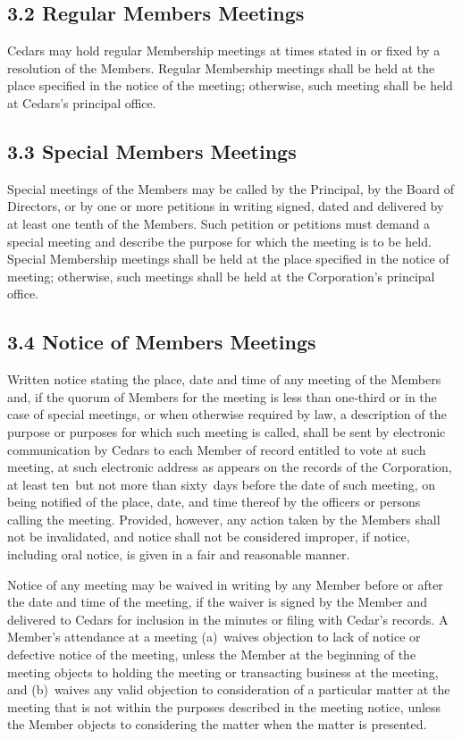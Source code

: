 \documentclass[
]{book}
\begin{document}
\subsection{3.2 Regular Members Meetings}\label{regular-members-meetings}

Cedars may hold regular Membership meetings at times stated in or fixed by a resolution of the Members. Regular Membership meetings shall be held at the place specified in the notice of the meeting; otherwise, such meeting shall be held at Cedars's principal office.

\subsection{3.3 Special Members Meetings}\label{special-members-meetings}

Special meetings of the Members may be called by the Principal, by the Board of Directors, or by one or more petitions in writing signed, dated and delivered by at least one tenth of the Members. Such petition or petitions must demand a special meeting and describe the purpose for which the meeting is to be held. Special Membership meetings shall be held at the place specified in the notice of meeting; otherwise, such meetings shall be held at the Corporation's principal office.

\subsection{3.4 Notice of Members Meetings}\label{notice-of-members-meetings}

Written notice stating the place, date and time of any meeting of the Members and, if the quorum of Members for the meeting is less than one‑third or in the case of special meetings, or when otherwise required by law, a description of the purpose or purposes for which such meeting is called, shall be sent by electronic communication by Cedars to each Member of record entitled to vote at such meeting, at such electronic address as appears on the records of the Corporation, at least ten~but not more than sixty~days before the date of such meeting, on being notified of the place, date, and time thereof by the officers or persons calling the meeting. Provided, however, any action taken by the Members shall not be invalidated, and notice shall not be considered improper, if notice, including oral notice, is given in a fair and reasonable manner.

Notice of any meeting may be waived in writing by any Member before or after the date and time of the meeting, if the waiver is signed by the Member and delivered to Cedars for inclusion in the minutes or filing with Cedar's records. A Member's attendance at a meeting (a)~waives objection to lack of notice or defective notice of the meeting, unless the Member at the beginning of the meeting objects to holding the meeting or transacting business at the meeting, and (b)~waives any valid objection to consideration of a particular matter at the meeting that is not within the purposes described in the meeting notice, unless the Member objects to considering the matter when the matter is presented.
\end{document}
